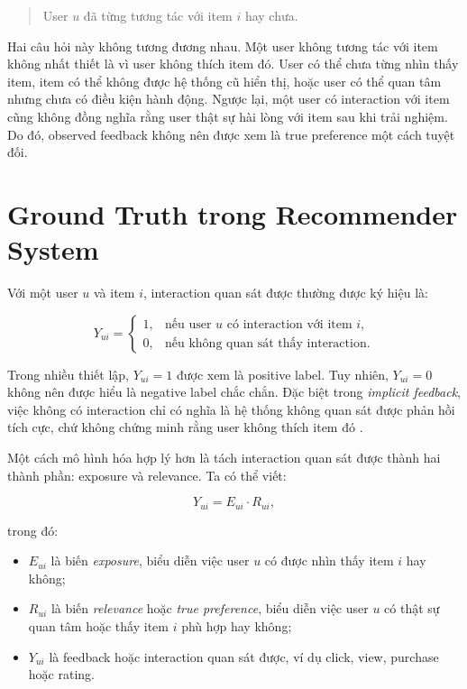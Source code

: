 \documentclass[12pt,a4paper]{article}
\begin{document}
\begin{quote}
User $u$ đã từng tương tác với item $i$ hay chưa.
\end{quote}

Hai câu hỏi này không tương đương nhau. 
Một user không tương tác với item không nhất thiết là vì user không thích item đó. 
User có thể chưa từng nhìn thấy item, item có thể không được hệ thống cũ hiển thị, hoặc user có thể quan tâm nhưng chưa có điều kiện hành động. 
Ngược lại, một user có interaction với item cũng không đồng nghĩa rằng user thật sự hài lòng với item sau khi trải nghiệm. 
Do đó, observed feedback không nên được xem là true preference một cách tuyệt đối.

\section{Ground Truth trong Recommender System}

Với một user $u$ và item $i$, interaction quan sát được thường được ký hiệu là:

\begin{equation}
Y_{ui} =
\begin{cases}
1, & \text{nếu user } u \text{ có interaction với item } i, \\
0, & \text{nếu không quan sát thấy interaction.}
\end{cases}
\end{equation}

Trong nhiều thiết lập, $Y_{ui}=1$ được xem là positive label. 
Tuy nhiên, $Y_{ui}=0$ không nên được hiểu là negative label chắc chắn. 
Đặc biệt trong \textit{implicit feedback}, việc không có interaction chỉ có nghĩa là hệ thống không quan sát được phản hồi tích cực, chứ không chứng minh rằng user không thích item đó \cite{saito2020unbiased}.

Một cách mô hình hóa hợp lý hơn là tách interaction quan sát được thành hai thành phần: exposure và relevance. 
Ta có thể viết:

\begin{equation}
Y_{ui} = E_{ui} \cdot R_{ui},
\end{equation}

trong đó:

\begin{itemize}[leftmargin=*]
    \item $E_{ui}$ là biến \textit{exposure}, biểu diễn việc user $u$ có được nhìn thấy item $i$ hay không;
    \item $R_{ui}$ là biến \textit{relevance} hoặc \textit{true preference}, biểu diễn việc user $u$ có thật sự quan tâm hoặc thấy item $i$ phù hợp hay không;
    \item $Y_{ui}$ là feedback hoặc interaction quan sát được, ví dụ click, view, purchase hoặc rating.
\end{itemize}
\end{document}
